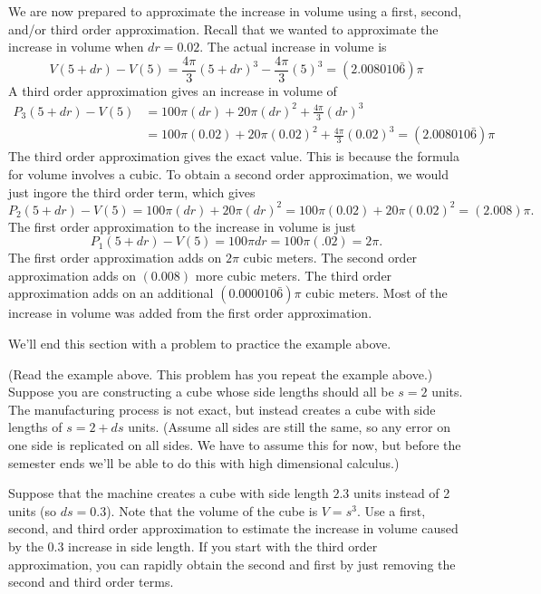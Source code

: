 \begin{example}
We are now prepared to approximate the increase in volume using a first, second, and/or third order approximation. 
Recall that we wanted to approximate the increase in volume when $dr=0.02$.  The actual increase in volume is 
$$V(5+dr)-V(5) = \frac{4\pi}{3}(5+dr)^3-\frac{4\pi}{3}(5)^3  = (2.008010\bar{6})\pi $$
A third order approximation gives an increase in volume of 
 \begin{align*}
P_3(5+dr) - V(5)
&=100\pi(dr)+20\pi(dr)^2+\frac{4\pi}{3}(dr)^3 \\
&=100\pi(0.02)+20\pi(0.02)^2+\frac{4\pi}{3}(0.02)^3 = (2.008010\bar{6})\pi
 \end{align*}
The third order approximation gives the exact value.  This is because the formula for volume involves a cubic.  To obtain a second order approximation, we would just ingore the third order term, which gives 
$$P_2(5+dr)-V(5)=100\pi(dr)+20\pi(dr)^2 = 100\pi(0.02)+20\pi(0.02)^2 = (2.008)\pi.$$
The first order approximation to the increase in volume is just
$$P_1(5+dr)-V(5)=100\pi dr =100\pi(.02) = 2\pi.$$ 
The first order approximation adds on $2\pi$ cubic meters. The second order approximation adds on $(0.008)$ more cubic meters.  The third order approximation adds on an additional 
$(0.000010\bar{6})\pi$ cubic meters. Most of the increase in volume was added from the first order approximation. 
\end{example}

 
 We'll end this section with a problem to practice the example above.
 
 \begin{problem} (Read the example above. This problem has you repeat the example above.)
 Suppose you are constructing a cube whose side lengths should all be $s=2$ units. The manufacturing process is not exact, but instead creates a cube with side lengths of $s=2+ds$ units. (Assume all sides are still the same, so any error on one side is replicated on all sides.  We have to assume this for now, but before the semester ends we'll be able to do this with high dimensional calculus.) 
 
 Suppose that the machine creates a cube with side length $2.3$ units instead of 2 units (so $ds=0.3$).  
 Note that the volume of the cube is $V=s^3$.  
 Use a first, second, and third order approximation to estimate the increase in volume caused by the 0.3 increase in side length. If you start with the third order approximation, you can rapidly obtain the second and first by just removing the second and third order terms.   
 \end{problem}


